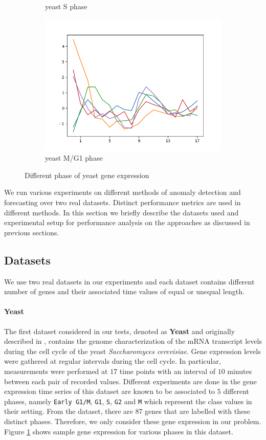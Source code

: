 \begin{figure}[t]
\begin{subfigure}{0.4\columnwidth}
		\caption{yeast S phase}
	\end{subfigure}
		\begin{subfigure}{0.4\columnwidth}
		\centering
		\includegraphics[width=\columnwidth, height=4 cm]{Figures/yeast_M_G1.png}
		\caption{yeast M/G1 phase}
	\end{subfigure}
	\caption{Different phase of yeast gene expression}
	\label{fig-yeast_data}
\end{figure}

We run various experiments on different methods of anomaly detection and  forecasting over two real datasets. Distinct performance metrics are used in different methods. 
In this section we briefly describe the datasets used and experimental setup for performance analysis on the approaches as discussed in previous sections.

\subsection{Datasets}
We use two real datasets in our experiments and each dataset contains different number of genes and their associated time values of equal or unequal length.

\paragraph*{\textbf{Yeast}} The first dataset considered in our tests, denoted as \textbf{Yeast} and originally described in \cite{first_dataset}, contains the genome characterization of the mRNA transcript levels during the cell cycle of the yeast \textit{Saccharomyces cerevisiae}. Gene expression levels were gathered at regular intervals during the cell cycle. In particular, measurements were performed at $17$ time points with an interval of $10$ minutes between each pair of recorded values. Different experiments are done in the gene expression time series of this dataset are known to be associated to $5$ different phases, namely \texttt{Early G1/M}, \texttt{G1}, \texttt{S}, \texttt{G2} and \texttt{M} which represent the class values in their setting. From the dataset, there are 87 genes that are labelled with these distinct phases. Therefore, we only consider these gene expression in our problem.  Figure \ref{fig-yeast_data} shows sample gene expression for various phases in this dataset.


